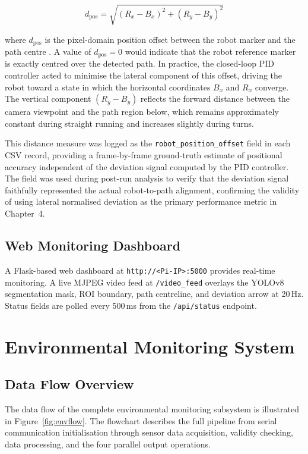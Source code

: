 \begin{equation}
  d_{\text{pos}} = \sqrt{(R_x - B_x)^2 + (R_y - B_y)^2}
  \label{eq:euclidean}
\end{equation}

\noindent
where $d_{\text{pos}}$ is the pixel-domain position offset between the robot
marker and the path centre \cite{r5,r6,r8}. A value of $d_{\text{pos}} = 0$ would indicate
that the robot reference marker is exactly centred over the detected path.
In practice, the closed-loop PID controller
acted to minimise the lateral component of this offset, driving the robot
toward a state in which the horizontal coordinates $B_x$ and $R_x$ converge.
The vertical component $(R_y - B_y)$ reflects the forward distance between
the camera viewpoint and the path region below, which remains approximately
constant during straight running and increases slightly during turns.

This distance measure was logged as the \texttt{robot\_position\_offset} field
in each CSV record, providing a frame-by-frame ground-truth estimate of
positional accuracy independent of the deviation signal computed by the
PID controller. The field was used during
post-run analysis to verify that the deviation signal faithfully represented
the actual robot-to-path alignment, confirming the validity of using lateral
normalised deviation as the primary performance metric in Chapter~4.

\subsection{Web Monitoring Dashboard}

A Flask-based web dashboard at \texttt{http://<Pi-IP>:5000} provides
real-time monitoring. A live MJPEG video feed at \texttt{/video\_feed}
overlays the YOLOv8 segmentation mask, ROI boundary, path centreline,
and deviation arrow at 20\,Hz. Status fields are polled every 500\,ms
from the \texttt{/api/status} endpoint.

\section{Environmental Monitoring System}

\subsection{Data Flow Overview}

The data flow of the complete environmental monitoring subsystem is
illustrated in Figure~\ref{fig:envflow}. The flowchart describes the
full pipeline from serial communication initialisation through sensor
data acquisition, validity checking, data processing, and the four
parallel output operations.

